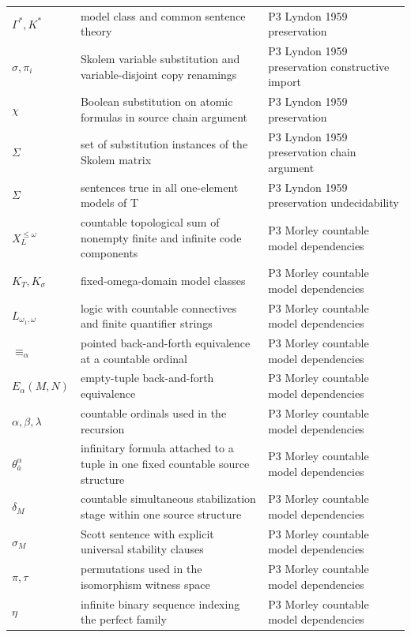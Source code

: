 \begin{longtable}{@{}p{}p{}p{}@{}}
\(\Gamma^*,\allowbreak K^*\) & model class and common sentence theory & P3 Lyndon 1959 preservation \\
\(\sigma,\allowbreak \pi_i\) & Skolem variable substitution and variable-disjoint copy renamings & P3 Lyndon 1959 preservation constructive import \\
\(\chi\) & Boolean substitution on atomic formulas in source chain argument & P3 Lyndon 1959 preservation \\
\(\Sigma\) & set of substitution instances of the Skolem matrix & P3 Lyndon 1959 preservation chain argument \\
\(\Sigma\) & sentences true in all one-element models of T & P3 Lyndon 1959 preservation undecidability \\
\(X_L^{\leq\omega}\) & countable topological sum of nonempty finite and infinite code components & P3 Morley countable model dependencies \\
\(K_T,\allowbreak K_\sigma\) & fixed-omega-domain model classes & P3 Morley countable model dependencies \\
\(L_{\omega_1,\omega}\) & logic with countable connectives and finite quantifier strings & P3 Morley countable model dependencies \\
\(\equiv_\alpha\) & pointed back-and-forth equivalence at a countable ordinal & P3 Morley countable model dependencies \\
\(E_\alpha(M,\allowbreak N)\) & empty-tuple back-and-forth equivalence & P3 Morley countable model dependencies \\
\(\alpha,\allowbreak \beta,\allowbreak \lambda\) & countable ordinals used in the recursion & P3 Morley countable model dependencies \\
\(\theta_{\bar a}^{\alpha}\) & infinitary formula attached to a tuple in one fixed countable source structure & P3 Morley countable model dependencies \\
\(\delta_M\) & countable simultaneous stabilization stage within one source structure & P3 Morley countable model dependencies \\
\(\sigma_M\) & Scott sentence with explicit universal stability clauses & P3 Morley countable model dependencies \\
\(\pi,\allowbreak \tau\) & permutations used in the isomorphism witness space & P3 Morley countable model dependencies \\
\(\eta\) & infinite binary sequence indexing the perfect family & P3 Morley countable model dependencies \\

\end{longtable}
